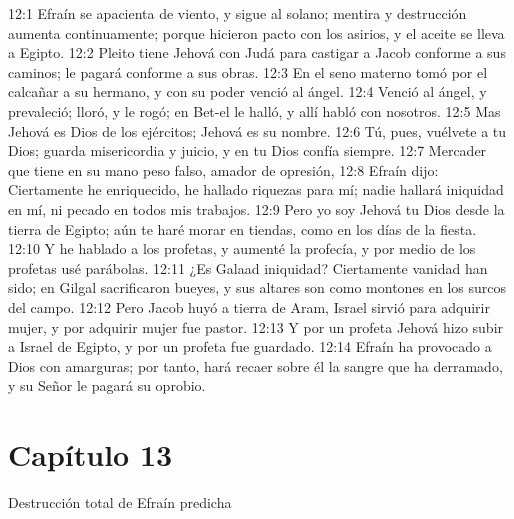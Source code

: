											12:1 Efraín se apacienta de viento, y sigue al solano; mentira y destrucción aumenta continuamente; porque hicieron pacto con los asirios, y el aceite se lleva a Egipto. 
											12:2 Pleito tiene Jehová con Judá para castigar a Jacob conforme a sus caminos; le pagará conforme a sus obras. 
											12:3 En el seno materno tomó por el calcañar a su hermano, y con su poder venció al ángel. 
											12:4 Venció al ángel, y prevaleció; lloró, y le rogó; en Bet-el le halló, y allí habló con nosotros. 
											12:5 Mas Jehová es Dios de los ejércitos; Jehová es su nombre. 
											12:6 Tú, pues, vuélvete a tu Dios; guarda misericordia y juicio, y en tu Dios confía siempre. 
											12:7 Mercader que tiene en su mano peso falso, amador de opresión, 
											12:8 Efraín dijo: Ciertamente he enriquecido, he hallado riquezas para mí; nadie hallará iniquidad en mí, ni pecado en todos mis trabajos. 
											12:9 Pero yo soy Jehová tu Dios desde la tierra de Egipto; aún te haré morar en tiendas, como en los días de la fiesta. 
											12:10 Y he hablado a los profetas, y aumenté la profecía, y por medio de los profetas usé parábolas. 
											12:11 ¿Es Galaad iniquidad? Ciertamente vanidad han sido; en Gilgal sacrificaron bueyes, y sus altares son como montones en los surcos del campo. 
											12:12 Pero Jacob huyó a tierra de Aram, Israel sirvió para adquirir mujer, y por adquirir mujer fue pastor. 
											12:13 Y por un profeta Jehová hizo subir a Israel de Egipto, y por un profeta fue guardado. 
											12:14 Efraín ha provocado a Dios con amarguras; por tanto, hará recaer sobre él la sangre que ha derramado, y su Señor le pagará su oprobio. 
											\section*{Capítulo 13 }
												Destrucción total de Efraín predicha 
												
